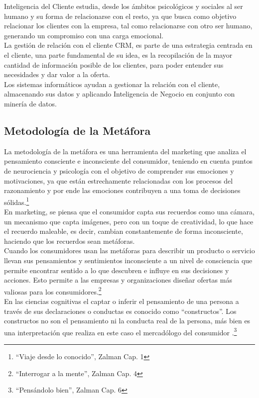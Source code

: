 Inteligencia del Cliente estudia, desde los ámbitos psicológicos y sociales al ser humano y su forma de relacionarse con el resto, ya que busca como objetivo relacionar los clientes con la empresa, tal como relacionarse con otro ser humano, generando un compromiso con una carga emocional.\\


La gestión de relación con el cliente CRM, es parte de una estrategia centrada en el cliente, una parte fundamental de su idea, es la recopilación de la mayor cantidad de información posible de los clientes, para poder entender sus necesidades y dar valor a la oferta.\cite{crm}\\


Los sistemas informáticos ayudan a gestionar la relación con el cliente, almacenando sus datos y aplicando Inteligencia de Negocio en conjunto con minería de datos.

\subsection{Metodología de la Metáfora}

La metodología de la metáfora es una herramienta del marketing que analiza el pensamiento consciente e inconsciente del consumidor, teniendo en cuenta puntos de neurociencia y psicología con el objetivo de comprender sus emociones y motivaciones, ya que están estrechamente relacionadas con los procesos del razonamiento y por ende las emociones contribuyen a una toma de decisiones sólidas.\footnote{``Viaje desde lo conocido'', Zalman Cap. 1}\\

En marketing, se piensa que el consumidor capta sus recuerdos como una cámara, un mecanismo que capta imágenes, pero con un toque de creatividad, lo que hace el recuerdo maleable, es decir, cambian constantemente de forma inconsciente, haciendo que los recuerdos sean metáforas. \\

Cuando los consumidores usan las metáforas para describir un producto o servicio llevan sus pensamientos y sentimientos inconsciente a un nivel de consciencia que permite encontrar sentido a lo que descubren e influye en sus decisiones y acciones. Esto permite a las empresas y organizaciones diseñar ofertas más valiosas para los consumidores.\footnote{``Interrogar a la mente'', Zalman Cap. 4}\\

En las ciencias cognitivas el captar o inferir el pensamiento de una persona a través de sus declaraciones o conductas es conocido como ``constructos''. Los constructos no son el pensamiento ni la conducta real de la persona, más bien es una interpretación que realiza en este caso el mercadólogo del consumidor .\footnote{``Pensándolo bien'', Zalman Cap. 6}\\

